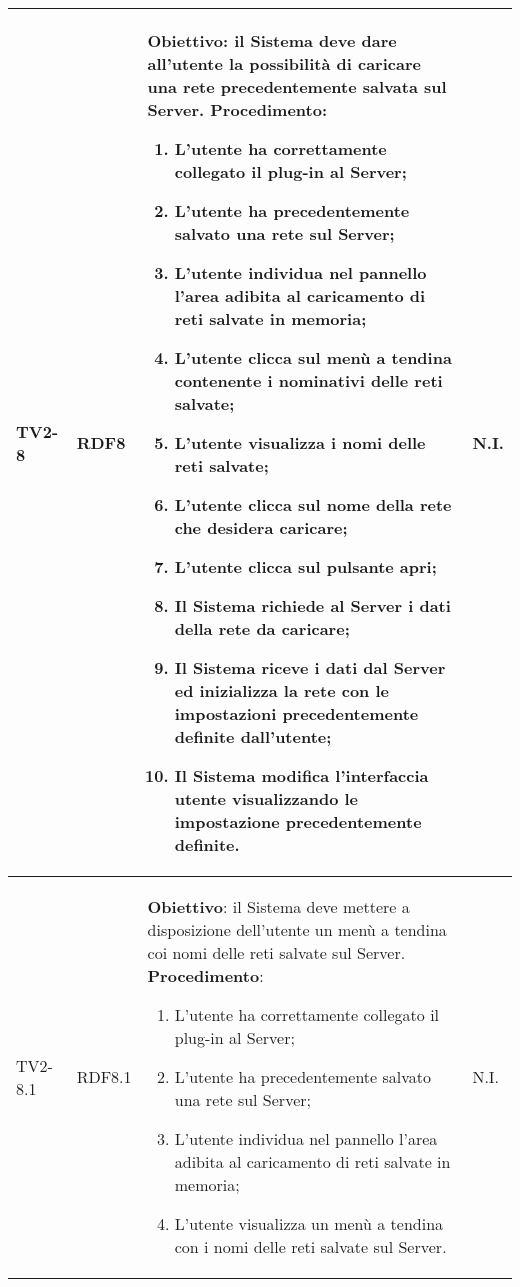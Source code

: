 \begin{longtable}{|C{.15\textwidth}|C{.13\textwidth}|m{.65\textwidth}|C{.08\textwidth}|}
TV2-8 & RDF8 &
	\textbf{Obiettivo}: il Sistema deve dare all'utente la possibilità di caricare una rete precedentemente salvata sul Server. \newline
	\textbf{Procedimento}:
	\begin{enumerate}
		\item L'utente ha correttamente collegato il plug-in al Server;
		\item L'utente ha precedentemente salvato una rete sul Server;
		\item L'utente individua nel pannello l'area adibita al caricamento di reti salvate in memoria;
		\item L'utente clicca sul menù a tendina contenente i nominativi delle reti salvate;
		\item L'utente visualizza i nomi delle reti salvate;
		\item L'utente clicca sul nome della rete che desidera caricare;
		\item L'utente clicca sul pulsante apri;
		\item Il Sistema richiede al Server i dati della rete da caricare;
		\item Il Sistema riceve i dati dal Server ed inizializza la rete con le impostazioni precedentemente definite dall'utente;
		\item Il Sistema modifica l'interfaccia utente visualizzando le impostazione precedentemente definite.
	\end{enumerate}
	& N.I. \\
\hline

TV2-8.1 & RDF8.1 &
	\textbf{Obiettivo}: il Sistema deve mettere a disposizione dell'utente un menù a tendina coi nomi delle reti salvate sul Server. \newline
	\textbf{Procedimento}:
	\begin{enumerate}
		\item L'utente ha correttamente collegato il plug-in al Server;
		\item L'utente ha precedentemente salvato una rete sul Server;
		\item L'utente individua nel pannello l'area adibita al caricamento di reti salvate in memoria;
		\item L'utente visualizza un menù a tendina con i nomi delle reti salvate sul Server.
	\end{enumerate}
	& N.I. \\
\hline


\end{longtable}

